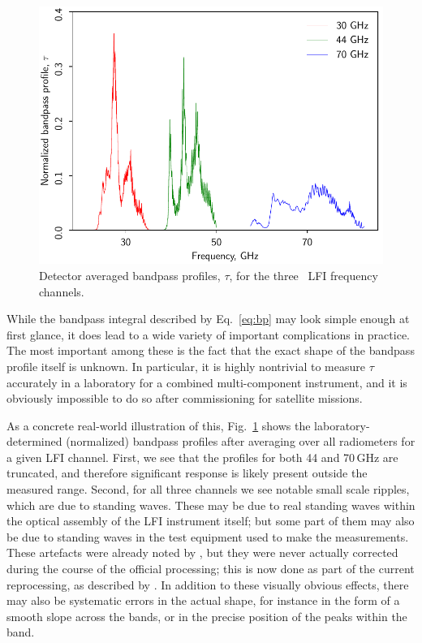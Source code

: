 \documentclass[twocolumn]{aa}
\begin{document}
\begin{figure}[t]
  \center
  \includegraphics[width=\linewidth]{figs/bp_LFI_v1.pdf}
  \caption{Detector averaged bandpass profiles, $\tau$, for the three
    \Planck\ LFI frequency channels. }
  \label{fig:bp_LFI}
\end{figure}

While the bandpass integral described by Eq.~\eqref{eq:bp} may look
simple enough at first glance, it does lead to a wide variety of
important complications in practice. The most important among these is
the fact that the exact shape of the bandpass profile itself is
unknown. In particular, it is highly nontrivial to measure $\tau$
accurately in a laboratory for a combined multi-component instrument,
and it is obviously impossible to do so after commissioning for
satellite missions.

As a concrete real-world illustration of this, Fig.~\ref{fig:bp_LFI}
shows the laboratory-determined (normalized) bandpass profiles after
averaging over all radiometers for a given LFI channel. First, we see
that the profiles for both 44 and 70\,GHz are truncated, and therefore
significant response is likely present outside the measured
range. Second, for all three channels we see notable small scale
ripples, which are due to standing waves. These may be due to real
standing waves within the optical assembly of the LFI instrument
itself; but some part of them may also be due to standing waves in the
test equipment used to make the measurements. These artefacts were
already noted by \citet{zonca2009}, but they were never actually
corrected during the course of the official processing; this is now
done as part of the current reprocessing, as described by
\citet{bp09}. In addition to these visually obvious effects, there may
also be systematic errors in the actual shape, for instance in the
form of a smooth slope across the bands, or in the precise position of
the peaks within the band.
\end{document}
